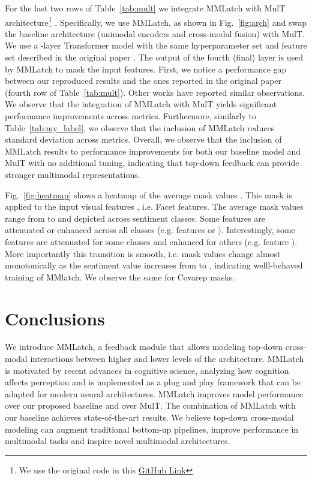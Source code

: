 \documentclass{article}
\begin{document}
For the last two rows of Table~\ref{tab:mult} we integrate MMLatch with MulT architecture\footnote{We use the original code in this \href{https://github.com/yaohungt/Multimodal-Transformer}{GitHub Link}} \cite{tsai-etal-2019-multimodal}. Specifically, we use MMLatch, as shown in Fig.~\ref{fig:arch} and swap the baseline architecture (unimodal encoders and cross-modal fusion) with MulT. We use a -layer Transformer model with the same hyperparameter set and feature set described in the original paper \cite{tsai-etal-2019-multimodal}.
The output of the fourth (final) layer is used by MMLatch to mask the input features.
First, we notice a performance gap between our reproduced results and the ones reported in the original paper (fourth row of Table~\ref{tab:mult}). Other works \cite{wen2021cross,sourav-ouyang-2021-lightweight} have reported similar observations.
We observe that the integration of MMLatch with MulT yields significant performance improvements across metrics.
Furthermore, similarly to Table~\ref{tab:my_label}, we observe that the inclusion of MMLatch reduces standard deviation across metrics. 
Overall, we observe that the inclusion of MMLatch results to performance improvements for both our baseline model and MulT with no additional tuning, indicating that top-down feedback can provide stronger multimodal representations.




Fig.~\ref{fig:heatmap} shows a heatmap of the average mask values .
This mask is applied to the input visual features , i.e.  Facet features. The average mask values range from  to  and depicted across  sentiment classes.
Some features are attenuated or enhanced across all classes (e.g. features  or ). 
Interestingly, some features are attenuated for some classes and enhanced for others (e.g. feature ).
More importantly this transition is smooth, i.e. mask values change almost monotonically as the sentiment value increases from  to , indicating welll-behaved training of MMlatch. We observe the same for Covarep masks.




\section{Conclusions}
\label{sec:conclusions}

We introduce MMLatch, a feedback module that allows modeling top-down cross-modal interactions between higher and lower levels of the architecture. 
MMLatch is motivated by recent advances in cognitive science, analyzing how cognition affects perception and is implemented as a plug and play framework that can be adapted for modern neural architectures.
MMLatch improves model performance over our proposed baseline and over MulT. The combination of MMLatch with our baseline achieves state-of-the-art results.
We believe top-down cross-modal modeling can augment traditional bottom-up pipelines, improve performance in multimodal tasks and inspire novel multimodal architectures.
\end{document}
